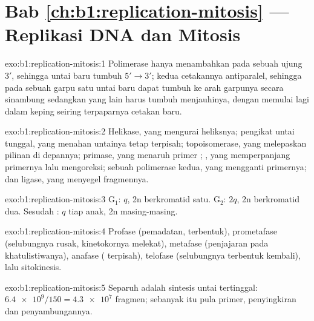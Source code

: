 \section*{Bab \ref{ch:b1:replication-mitosis} --- Replikasi DNA dan Mitosis}

\begin{solution}{exo:b1:replication-mitosis:1}
Polimerase hanya menambahkan  pada sebuah ujung $3'$,
sehingga untai baru tumbuh $5' \to 3'$; kedua cetakannya antiparalel,
sehingga pada sebuah garpu satu untai baru dapat tumbuh ke arah
garpunya secara sinambung sedangkan yang lain harus tumbuh menjauhinya,
dengan memulai lagi dalam keping seiring terpaparnya cetakan baru.
\end{solution}

\begin{solution}{exo:b1:replication-mitosis:2}
Helikase, yang mengurai heliksnya;  pengikat untai tunggal, yang
menahan untainya tetap terpisah; topoisomerase, yang melepaskan
pilinan di depannya; primase, yang menaruh primer ; ,
yang memperpanjang primernya lalu mengoreksi; sebuah polimerase kedua,
yang mengganti primernya; dan ligase, yang menyegel fragmennya.
\end{solution}

\begin{solution}{exo:b1:replication-mitosis:3}
G$_1$: $q$, 2n  berkromatid satu. G$_2$: $2q$, 2n 
berkromatid dua. Sesudah : $q$ tiap  anak, 2n 
masing-masing.
\end{solution}

\begin{solution}{exo:b1:replication-mitosis:4}
Profase (pemadatan,  terbentuk), prometafase (selubungnya
rusak, kinetokornya melekat), metafase (penjajaran pada khatulistiwanya),
anafase ( terpisah), telofase (selubungnya terbentuk
kembali), lalu sitokinesis.
\end{solution}

\begin{solution}{exo:b1:replication-mitosis:5}
Separuh  adalah sintesis untai tertinggal: $\num{6.4e9}/150 =
\num{4.3e7}$ fragmen; sebanyak itu pula primer, penyingkiran dan
penyambungannya.
\end{solution}

